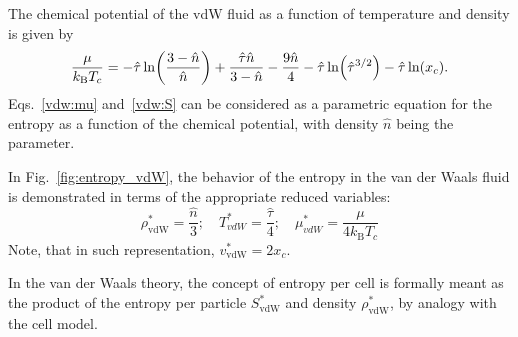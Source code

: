 \documentclass[entropy,article,submit,pdftex,moreauthors]{Definitions/mdpi}
\begin{document}
The chemical potential of the vdW fluid as a function of temperature and density is given by~\cite[(70c)]{Johnston14}
\begin{equation}
	\label{vdw:mu}
	\frac{\mu}{k_{\rm B}T_c} = -\hat{\tau} \ln \left(\frac{3-\hat{n}}{\hat{n}}\right) + \frac{\hat{\tau}\hat{n}}{3-\hat{n}} - \frac{9\hat{n}}{4} - \hat{\tau}\ln(\hat{\tau}^{3/2}) - \hat{\tau}\ln(x_c).
\end{equation}
Eqs.~\eqref{vdw:mu} and~\eqref{vdw:S} can be considered as a parametric equation for the entropy as a function of the chemical potential, with density $\hat{n}$ being the parameter.

In Fig.~\ref{fig:entropy_vdW}, the behavior of the entropy in the van der Waals fluid is demonstrated in terms of the appropriate reduced variables:
\begin{equation}
	\rho^*_{\mathrm{vdW}} = \frac{\hat{n}}{3}; \quad T^*_{vdW} = \frac{\hat{\tau}}{4}; \quad \mu^*_{vdW} = \frac{\mu}{4k_{\mathrm B}T_c}
\end{equation}
Note, that in such representation, $v^*_{\mathrm{vdW}} = 2x_c$.

In the van der Waals theory, the concept of entropy per cell is formally meant as the product of the entropy per particle $S^*_{\mathrm{vdW}}$ and density $\rho^*_{\mathrm{vdW}}$, by analogy with the cell model.
\end{document}
